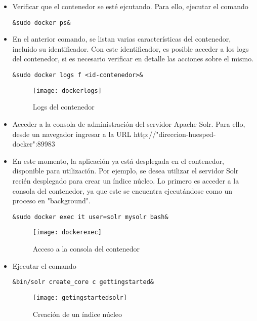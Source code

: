 \documentclass[10pt]{article}   			%
\begin{document}
\begin{itemize}
\item Verificar que el contenedor se esté ejcutando. Para ello, ejecutar el comando
\begin{small}
\begin{lstlisting}[frame=single,style=base]	
	&sudo docker ps&
\end{lstlisting}
\end{small}

\item En el anterior comando, se listan varias características del contenedor, incluido su identificador. Con este identificador, es posible acceder a los logs del contenedor, si es necesario verificar en detalle las acciones sobre el mismo.
\begin{small}
\begin{lstlisting}[frame=single,style=base]	
	&sudo docker logs f <id-contenedor>&
\end{lstlisting}
\end{small}
\begin{figure}[ht] 
	\centering
		\texttt{[image: dockerlogs]}   
	\caption{Logs del contenedor} \label{fig:dockerlogs}
\end{figure}

\item Acceder a la consola de administración del servidor Apache Solr. Para ello, desde un navegador ingresar a la URL http://"direccion-huesped-docker":89983

\item En este momento, la aplicación ya está desplegada en el contenedor, disponible para utilización. Por ejemplo, se desea utilizar el servidor Solr recién desplegado para crear un índice núcleo. Lo primero es acceder a la consola del contenedor, ya que este se encuentra ejecutándose como un proceso en "background".
\begin{small}
\begin{lstlisting}[frame=single,style=base]	
	&sudo docker exec it user=solr mysolr bash&
\end{lstlisting}
\end{small}
\begin{figure}[ht] 
	\centering
		\texttt{[image: dockerexec]}   
	\caption{Acceso a la consola del contenedor} \label{fig:dockerexec}
\end{figure}

\item Ejecutar el comando
\begin{small}
\begin{lstlisting}[frame=single,style=base]	
	&bin/solr create_core c gettingstarted&
\end{lstlisting}
\end{small}
\begin{figure}[ht] 
	\centering
		\texttt{[image: getingstartedsolr]}   
	\caption{Creación de un índice núcleo} \label{fig:getingstartedsolr}
\end{figure}


\end{itemize}
\end{document}
